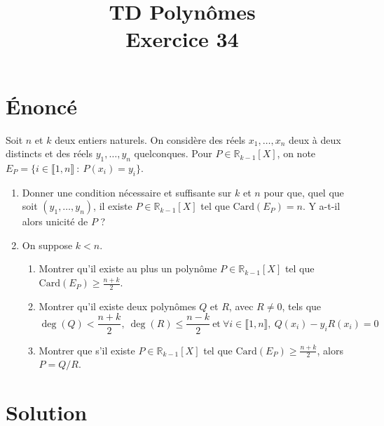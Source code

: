 \documentclass[french]{article}
\title{TD Polynômes \\ Exercice 34}
\date{}
\newcommand{\R}{\mathbb{R}}
\newcommand{\card}{\text{Card}}
\begin{document}
\maketitle

\section{Énoncé}
Soit $n$ et $k$ deux entiers naturels. On considère des réels $x_1,\ldots,x_n$ deux à deux distincts et des réels $y_1,\ldots,y_n$ quelconques. Pour $P\in\R_{k-1}[X]$, on note $E_P=\{i\in\llbracket1,n\rrbracket\ : \ P(x_i)=y_i\}$.
\begin{enumerate}
	\item Donner une condition nécessaire et suffisante sur $k$ et $n$ pour que, quel que soit $(y_1,\ldots,y_n)$, il existe $P\in\R_{k-1}[X]$ tel que $\card(E_P)=n$. Y a-t-il alors unicité de $P$ ?
	\item On suppose $k< n$.
	\begin{enumerate}[label=\alph*.]
		\item Montrer qu'il existe au plus un polynôme $P\in\R_{k-1}[X]$ tel que $\displaystyle\card(E_P)\geqslant\frac{n+k}{2}$.
		\item Montrer qu'il existe deux polynômes $Q$ et $R$, avec $R\ne 0$, tels que $$\deg(Q)<\frac{n+k}{2},\ \deg(R)\leqslant\frac{n-k}{2}\ \text{et}\ \forall i\in\llbracket1,n\rrbracket,\ Q(x_i)-y_iR(x_i)=0$$
		\item Montrer que s'il existe $P\in\R_{k-1}[X]$ tel que $\displaystyle\card(E_P)\geqslant\frac{n+k}{2}$, alors $P=Q/R$.
	\end{enumerate}
\end{enumerate}
\section{Solution}
\end{document}
